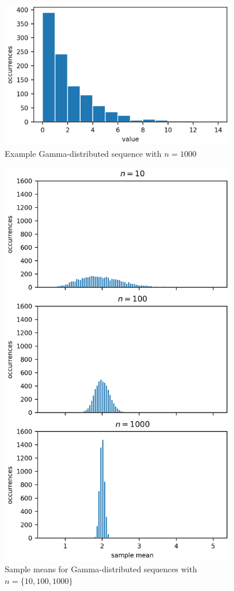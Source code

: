 \documentclass[11pt]{article}
\begin{document}
\subsection{}  %
\begin{figure}[H]
    \centering
    \includegraphics[width=4in]{4cfig1.png}
    \caption{Example Gamma-distributed sequence with $n=1000$}
    \label{4cfig1}
\end{figure}
\begin{figure}[H]
    \centering
    \includegraphics[width=4in]{4cfig2.png}
    \caption{Sample means for Gamma-distributed sequences with $n=\{10, 100, 1000\}$}
    \label{4cfig2}
\end{figure}
\end{document}
